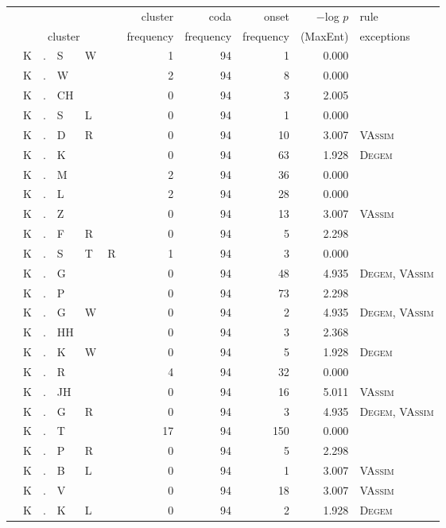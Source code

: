 \documentclass[12pt]{article}
\begin{document}
\begin{longtable}{r@{ } r@{ } c@{ } l@{ } l@{ } l@{ } r r r r l }
\toprule
 &   &   &  &   &  &  cluster  &  coda  &  onset  &  $-$log $p$  &  rule \\
\multicolumn{6}{c}{cluster}  &  frequency  &  frequency  &  frequency  &  (MaxEnt)  &  exceptions\\ 
\midrule
 & K & . & S & W &  & 1 & 94 & 1 & 0.000 &  \\
 & K & . & W &  &  & 2 & 94 & 8 & 0.000 &  \\
 & K & . & CH &  &  & 0 & 94 & 3 & 2.005 &  \\
 & K & . & S & L &  & 0 & 94 & 1 & 0.000 &  \\
 & K & . & D & R &  & 0 & 94 & 10 & 3.007 & \textsc{VAssim} \\
 & K & . & K &  &  & 0 & 94 & 63 & 1.928 & \textsc{Degem} \\
 & K & . & M &  &  & 2 & 94 & 36 & 0.000 &  \\
 & K & . & L &  &  & 2 & 94 & 28 & 0.000 &  \\
 & K & . & Z &  &  & 0 & 94 & 13 & 3.007 & \textsc{VAssim} \\
 & K & . & F & R &  & 0 & 94 & 5 & 2.298 &  \\
 & K & . & S & T & R & 1 & 94 & 3 & 0.000 &  \\
 & K & . & G &  &  & 0 & 94 & 48 & 4.935 & \textsc{Degem}, \textsc{VAssim} \\
 & K & . & P &  &  & 0 & 94 & 73 & 2.298 &  \\
 & K & . & G & W &  & 0 & 94 & 2 & 4.935 & \textsc{Degem}, \textsc{VAssim} \\
 & K & . & HH &  &  & 0 & 94 & 3 & 2.368 &  \\
 & K & . & K & W &  & 0 & 94 & 5 & 1.928 & \textsc{Degem} \\
 & K & . & R &  &  & 4 & 94 & 32 & 0.000 &  \\
 & K & . & JH &  &  & 0 & 94 & 16 & 5.011 & \textsc{VAssim} \\
 & K & . & G & R &  & 0 & 94 & 3 & 4.935 & \textsc{Degem}, \textsc{VAssim} \\
 & K & . & T &  &  & 17 & 94 & 150 & 0.000 &  \\
 & K & . & P & R &  & 0 & 94 & 5 & 2.298 &  \\
 & K & . & B & L &  & 0 & 94 & 1 & 3.007 & \textsc{VAssim} \\
 & K & . & V &  &  & 0 & 94 & 18 & 3.007 & \textsc{VAssim} \\
 & K & . & K & L &  & 0 & 94 & 2 & 1.928 & \textsc{Degem} \\

\end{longtable}
\end{document}
